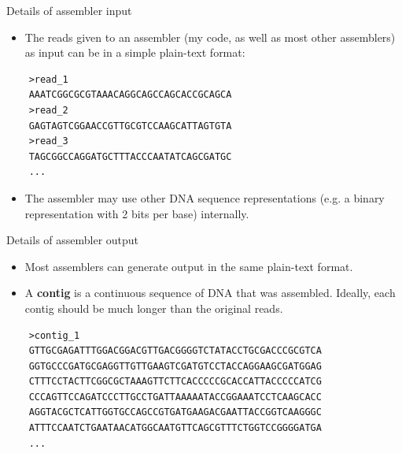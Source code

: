 \documentclass[xcolor=dvipsnames]{beamer}
\begin{document}
\begin{frame}[fragile]{Details of assembler input}
	\begin{itemize}
		\item The reads given to an assembler (my code, as well as most
		other assemblers) as input can be in a simple plain-text format:
	\end{itemize}
	\begin{verbatim}
	>read_1
	AAATCGGCGCGTAAACAGGCAGCCAGCACCGCAGCA
	>read_2
	GAGTAGTCGGAACCGTTGCGTCCAAGCATTAGTGTA
	>read_3
	TAGCGGCCAGGATGCTTTACCCAATATCAGCGATGC
	...
	\end{verbatim}
	\begin{itemize}
		\item The assembler may use other DNA sequence representations
		(e.g. a binary representation with 2 bits per base) internally.
	\end{itemize}
\end{frame}

\begin{frame}[fragile]{Details of assembler output}
	\begin{itemize}
		\item Most assemblers can generate output in the same plain-text
		format.
		\item A {\bf contig} is a continuous sequence of DNA that was
		assembled.  Ideally, each contig should be much longer than the
		original reads.
	\end{itemize}
	\begin{verbatim}
	>contig_1
	GTTGCGAGATTTGGACGGACGTTGACGGGGTCTATACCTGCGACCCGCGTCA
	GGTGCCCGATGCGAGGTTGTTGAAGTCGATGTCCTACCAGGAAGCGATGGAG
	CTTTCCTACTTCGGCGCTAAAGTTCTTCACCCCCGCACCATTACCCCCATCG
	CCCAGTTCCAGATCCCTTGCCTGATTAAAAATACCGGAAATCCTCAAGCACC
	AGGTACGCTCATTGGTGCCAGCCGTGATGAAGACGAATTACCGGTCAAGGGC
	ATTTCCAATCTGAATAACATGGCAATGTTCAGCGTTTCTGGTCCGGGGATGA
	...
	\end{verbatim}
\end{frame}
\end{document}
